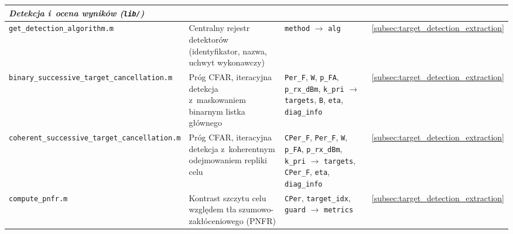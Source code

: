 \begin{table}[H]
\begin{tabular}{|p{3.3cm}|p{4.5cm}|p{4.3cm}|p{2.2cm}|}
        \hline
        \multicolumn{4}{|l|}{\textit{Detekcja i~ocena wyników (\texttt{lib/})}} \\
        \hline
        \texttt{get\_detection\_\allowbreak algorithm.m} & Centralny rejestr detektorów (identyfikator, nazwa, uchwyt wykonawczy) & \texttt{method} $\rightarrow$ \texttt{alg} & \ref{subsec:target_detection_extraction} \\
        \hline
        \texttt{binary\_\allowbreak successive\_\allowbreak target\_\allowbreak cancellation.m} & Próg CFAR, iteracyjna detekcja z~maskowaniem binarnym listka głównego & \texttt{Per\_F}, \texttt{W}, \texttt{p\_FA}, \texttt{p\_rx\_dBm}, \texttt{k\_pri} $\rightarrow$ \texttt{targets}, \texttt{B}, \texttt{eta}, \texttt{diag\_info} & \ref{subsec:target_detection_extraction} \\
        \hline
        \texttt{coherent\_\allowbreak successive\_\allowbreak target\_\allowbreak cancellation.m} & Próg CFAR, iteracyjna detekcja z~koherentnym odejmowaniem repliki celu & \texttt{CPer\_F}, \texttt{Per\_F}, \texttt{W}, \texttt{p\_FA}, \texttt{p\_rx\_dBm}, \texttt{k\_pri} $\rightarrow$ \texttt{targets}, \texttt{CPer\_F}, \texttt{eta}, \texttt{diag\_info} & \ref{subsec:target_detection_extraction} \\
        \hline
        \texttt{compute\_pnfr.m} & Kontrast szczytu celu względem tła szumowo-zakłóceniowego (PNFR) & \texttt{CPer}, \texttt{target\_idx}, \texttt{guard} $\rightarrow$ \texttt{metrics} & \ref{subsec:target_detection_extraction} \\
        \hline
    \end{tabular}
\end{table}
